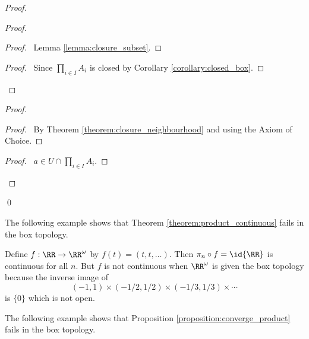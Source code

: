 \begin{proof}
    \pf
    \begin{proof}
        \begin{proof}
            \pf\ Lemma \ref{lemma:closure_subset}.
        \end{proof}
        \qedstep
        \begin{proof}
            \pf\ Since $\prod_{i \in I} A_i$ is closed by Corollary \ref{corollary:closed_box}.
        \end{proof}
    \end{proof}
    \begin{proof}
        \begin{proof}
            \pf\ By Theorem \ref{theorem:closure_neighbourhood} and  using the Axiom of Choice.
        \end{proof}
        \qedstep
        \begin{proof}
            \pf\ $a \in U \cap \prod_{i \in I} A_i$.
        \end{proof}
    \end{proof}
    \qed
\end{proof}

The following example shows that Theorem \ref{theorem:product_continuous} fails in the box topology.

\begin{example}
    Define $f : \RR \rightarrow \RR^\omega$ by $f(t) = (t, t, \ldots)$. Then $\pi_n \circ f = \id{\RR}$ is continuous for all $n$.
    But $f$ is not continuous when $\RR^\omega$ is given the box topology because the inverse image of
    \[ (-1,1) \times (-1/2, 1/2) \times (-1/3,1/3) \times \cdots \]
    is $\{0\}$ which is not open.
\end{example}

The following example shows that Proposition \ref{proposition:converge_product} fails in the box topology.

